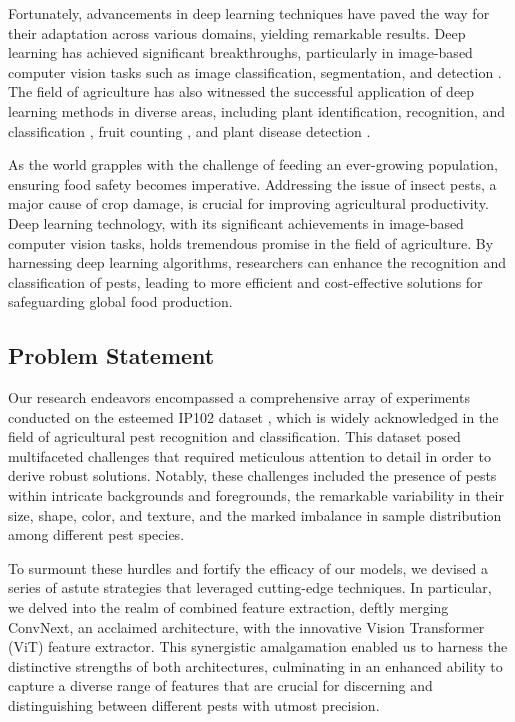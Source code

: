 Fortunately, advancements in deep learning techniques have paved the way for their adaptation across various domains, yielding remarkable results. Deep learning has achieved significant breakthroughs, particularly in image-based computer vision tasks such as image classification, segmentation, and detection \cite{reyes2015fine, he2016deep, huang2017densely}. The field of agriculture has also witnessed the successful application of deep learning methods in diverse areas, including plant identification, recognition, and classification \cite{reyes2015fine, dyrmann2016plant, zhang2018deep, ji20183d, lin2019fourier}, fruit counting \cite{chen2017counting}, and plant disease detection \cite{mohanty2016using}.

As the world grapples with the challenge of feeding an ever-growing population, ensuring food safety becomes imperative. Addressing the issue of insect pests, a major cause of crop damage, is crucial for improving agricultural productivity. Deep learning technology, with its significant achievements in image-based computer vision tasks, holds tremendous promise in the field of agriculture. By harnessing deep learning algorithms, researchers can enhance the recognition and classification of pests, leading to more efficient and cost-effective solutions for safeguarding global food production.


\subsection{Problem Statement}
Our research endeavors encompassed a comprehensive array of experiments conducted on the esteemed IP102 dataset \cite{wu2019ip102}, which is widely acknowledged in the field of agricultural pest recognition and classification. This dataset posed multifaceted challenges that required meticulous attention to detail in order to derive robust solutions. Notably, these challenges included the presence of pests within intricate backgrounds and foregrounds, the remarkable variability in their size, shape, color, and texture, and the marked imbalance in sample distribution among different pest species.

To surmount these hurdles and fortify the efficacy of our models, we devised a series of astute strategies that leveraged cutting-edge techniques. In particular, we delved into the realm of combined feature extraction, deftly merging ConvNext, an acclaimed architecture, with the innovative Vision Transformer (ViT) feature extractor. This synergistic amalgamation enabled us to harness the distinctive strengths of both architectures, culminating in an enhanced ability to capture a diverse range of features that are crucial for discerning and distinguishing between different pests with utmost precision.

